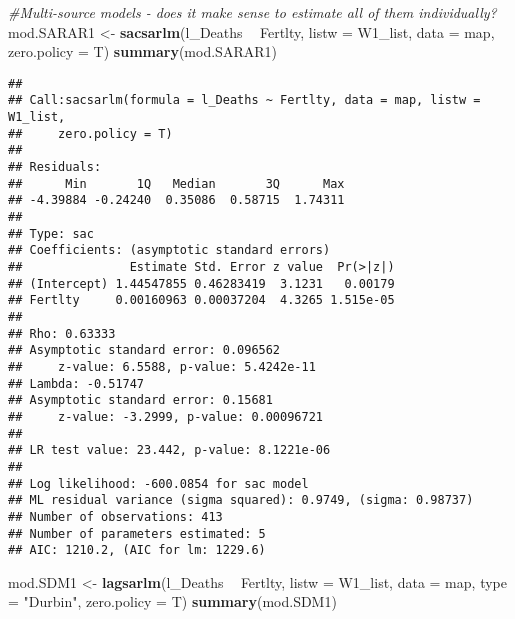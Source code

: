 \documentclass[]{article}
\newenvironment{Shaded}{\begin{snugshade}}{\end{snugshade}}
\newcommand{\KeywordTok}[1]{\textcolor[rgb]{0.13,0.29,0.53}{\textbf{#1}}}
\newcommand{\DataTypeTok}[1]{\textcolor[rgb]{0.13,0.29,0.53}{#1}}
\newcommand{\StringTok}[1]{\textcolor[rgb]{0.31,0.60,0.02}{#1}}
\newcommand{\CommentTok}[1]{\textcolor[rgb]{0.56,0.35,0.01}{\textit{#1}}}
\newcommand{\OperatorTok}[1]{\textcolor[rgb]{0.81,0.36,0.00}{\textbf{#1}}}
\newcommand{\NormalTok}[1]{#1}
\begin{document}
\begin{Shaded}
\begin{Highlighting}[]
\CommentTok{#Multi-source models - does it make sense to estimate all of them individually?}
\NormalTok{mod.SARAR1 <-}\StringTok{ }\KeywordTok{sacsarlm}\NormalTok{(l_Deaths }\OperatorTok{~}\StringTok{ }\NormalTok{Fertlty, }\DataTypeTok{listw =}\NormalTok{ W1_list, }\DataTypeTok{data =}\NormalTok{ map, }\DataTypeTok{zero.policy =}\NormalTok{ T)}
\KeywordTok{summary}\NormalTok{(mod.SARAR1)}
\end{Highlighting}
\end{Shaded}

\begin{verbatim}
## 
## Call:sacsarlm(formula = l_Deaths ~ Fertlty, data = map, listw = W1_list, 
##     zero.policy = T)
## 
## Residuals:
##      Min       1Q   Median       3Q      Max 
## -4.39884 -0.24240  0.35086  0.58715  1.74311 
## 
## Type: sac 
## Coefficients: (asymptotic standard errors) 
##               Estimate Std. Error z value  Pr(>|z|)
## (Intercept) 1.44547855 0.46283419  3.1231   0.00179
## Fertlty     0.00160963 0.00037204  4.3265 1.515e-05
## 
## Rho: 0.63333
## Asymptotic standard error: 0.096562
##     z-value: 6.5588, p-value: 5.4242e-11
## Lambda: -0.51747
## Asymptotic standard error: 0.15681
##     z-value: -3.2999, p-value: 0.00096721
## 
## LR test value: 23.442, p-value: 8.1221e-06
## 
## Log likelihood: -600.0854 for sac model
## ML residual variance (sigma squared): 0.9749, (sigma: 0.98737)
## Number of observations: 413 
## Number of parameters estimated: 5 
## AIC: 1210.2, (AIC for lm: 1229.6)
\end{verbatim}

\begin{Shaded}
\begin{Highlighting}[]
\NormalTok{mod.SDM1 <-}\StringTok{ }\KeywordTok{lagsarlm}\NormalTok{(l_Deaths }\OperatorTok{~}\StringTok{ }\NormalTok{Fertlty, }\DataTypeTok{listw =}\NormalTok{ W1_list, }\DataTypeTok{data =}\NormalTok{ map, }\DataTypeTok{type =} \StringTok{"Durbin"}\NormalTok{, }\DataTypeTok{zero.policy =}\NormalTok{ T)}
\KeywordTok{summary}\NormalTok{(mod.SDM1)}
\end{Highlighting}
\end{Shaded}
\end{document}
